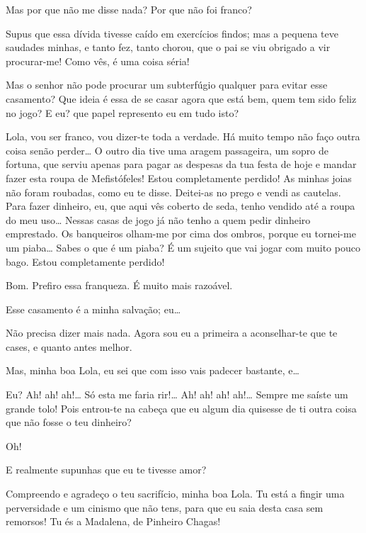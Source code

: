  Mas por que não me disse nada? Por que não foi franco?

 Supus que essa dívida tivesse caído em exercícios findos; mas a
pequena teve saudades minhas, e tanto fez, tanto chorou, que o pai se viu
obrigado a vir procurar-me! Como vês, é uma coisa séria!

 Mas o senhor não pode procurar um subterfúgio qualquer para evitar
esse casamento? Que ideia é essa de se casar agora que está bem, quem tem sido
feliz no jogo? E eu? que papel represento eu em tudo isto?

  Lola, vou ser franco, vou dizer-te toda a
verdade.  Há muito tempo não faço outra coisa senão perder\ldots{} O
outro dia tive uma aragem passageira, um sopro de fortuna, que serviu apenas para
pagar as despesas da tua festa de hoje e mandar fazer esta roupa de Mefistófeles!
Estou completamente perdido! As minhas joias não foram roubadas, como eu te
disse. Deitei-as no prego e vendi as cautelas. Para fazer dinheiro, eu, que aqui
vês coberto de seda, tenho vendido até a roupa do meu uso\ldots{} Nessas casas de jogo já
não tenho a quem pedir dinheiro emprestado. Os banqueiros olham-me por cima dos
ombros, porque eu tornei-me um piaba\ldots{} Sabes o que é um piaba? É um
sujeito que vai jogar com muito pouco bago. Estou completamente perdido!

  Bom. Prefiro essa franqueza. É muito mais razoável.

  Esse casamento é a minha salvação; eu\ldots{}

 Não precisa dizer mais nada. Agora sou eu a primeira a aconselhar-te
que te cases, e quanto antes melhor.

 Mas, minha boa Lola, eu sei que com isso vais padecer bastante,
e\ldots{}

 Eu? Ah! ah! ah!\ldots{} Só esta me faria rir!\ldots{} Ah! ah! ah! ah!\ldots{}
Sempre me saíste um grande tolo! Pois entrou-te na cabeça que eu algum dia quisesse de ti
outra coisa que não fosse o teu dinheiro?

  Oh!

 E realmente supunhas que eu te tivesse amor?

  Compreendo e agradeço o teu sacrifício, minha boa
Lola. Tu está a fingir uma perversidade e um cinismo que não tens, para que
eu saia desta casa sem remorsos! Tu és a Madalena, de Pinheiro Chagas!

